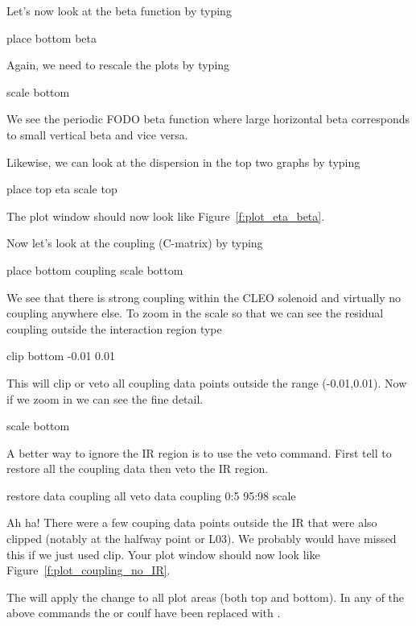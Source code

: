 \documentclass{report}
\begin{document}
Let's now look at the beta function by typing
\begin{example}
  place bottom beta
\end{example}
Again, we need to rescale the plots by typing
\begin{example}
  scale bottom
\end{example}
We see the periodic FODO beta function where large horizontal beta corresponds to
small vertical beta and vice versa.

Likewise, we can look at the dispersion in the top two graphs by typing
\begin{example}
  place top eta
  scale top
\end{example}
The plot window should now look like Figure~\ref{f:plot_eta_beta}.

Now let's look at the coupling (C-matrix) by typing
\begin{example}
  place bottom coupling
  scale bottom
\end{example}
We see that there is strong coupling within the CLEO solenoid and virtually no
coupling anywhere else. To zoom in the scale so that we can see the residual
coupling outside the interaction region type
\begin{example}
  clip bottom -0.01 0.01
\end{example}
This will clip or veto all coupling data points outside the range (-0.01,0.01).
Now if we zoom in we can see the fine detail.
\begin{example}
  scale bottom
\end{example}
A better way to ignore the IR region is to use the veto command. First tell \tao
to restore all the coupling data then veto the IR region.
\begin{example}
  restore data coupling all
  veto data coupling 0:5 95:98
  scale
\end{example}
Ah ha! There were a few couping data points outside the IR  that were also
clipped (notably at the halfway point or L03). We probably would have missed
this if we just used clip. Your plot window should now look like
Figure~\ref{f:plot_coupling_no_IR}.



The  will apply the change to all plot areas (both top and bottom). In
any of the above commands the  or  coulf have been replaced
with .
\end{document}
